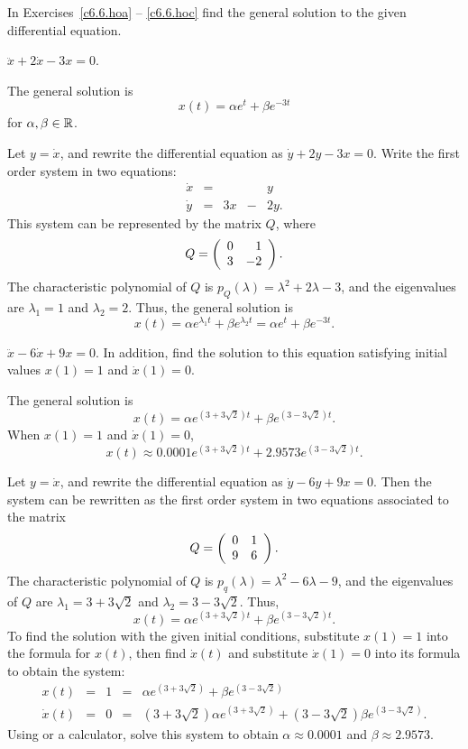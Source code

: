 \documentclass{ximera}
\begin{document}
\noindent  In Exercises~\ref{c6.6.hoa} -- \ref{c6.6.hoc} find the general
solution to the given differential equation.
\begin{exercise} \label{c6.6.hoa}
$\ddot{x} + 2\dot{x} - 3x = 0$.

\begin{solution}

\ans The general solution is
\[
x(t) = \alpha e^t + \beta e^{-3t}
\]
for $\alpha, \beta \in \mbox{$\Bbb{R}$}$.

\soln Let $y = \dot{x}$, and rewrite the differential equation as
$\dot{y} + 2y - 3x = 0$.  Write the first order system in two equations:
\[
\begin{array}{rrrrr}
\dot{x} & = & & & y \\
\dot{y} & = & 3x & - & 2y.
\end{array}
\]
This system can be represented by the matrix $Q$, where
\[
Q = \left(\begin{array}{rr} 0 & 1\\ 3 &-2\end{array}\right).
\]
The characteristic polynomial of $Q$ is $p_Q(\lambda) = \lambda^2
+ 2\lambda - 3$, and the eigenvalues are $\lambda_1 = 1$ and
$\lambda_2 = 2$.  Thus, the general solution is
\[
x(t) = \alpha e^{\lambda_1t} + \beta e^{\lambda_2t} =
\alpha e^t + \beta e^{-3t}.
\]

\end{solution}
\end{exercise}
\begin{exercise} \label{c6.6.hob}
$\ddot{x} - 6\dot{x} + 9x = 0$.
In addition, find the solution to this equation satisfying
initial values $x(1)=1$ and $\dot{x}(1)=0$.

\begin{solution}

\ans The general solution is
\[
x(t) = \alpha e^{(3 + 3\sqrt{2})t} + \beta e^{(3 - 3\sqrt{2})t}.
\]
When $x(1) = 1$ and $\dot{x}(1) = 0$,
\[
x(t) \approx 0.0001e^{(3 + 3\sqrt{2})t} +
2.9573e^{(3 - 3\sqrt{2})t}.
\]

\soln Let $y = \dot{x}$, and rewrite the differential equation as
$\dot{y} - 6y + 9x = 0$.  Then the system can be rewritten as the first
order system in two equations associated to the matrix
\[
Q = \left(\begin{array}{rr} 0 & 1\\ 9 &6\end{array}\right).
\]
The characteristic polynomial of $Q$ is $p_q(\lambda) = \lambda^2 
- 6\lambda - 9$, and the eigenvalues of $Q$ are $\lambda_1 = 3 +
3\sqrt{2}$ and $\lambda_2 = 3 - 3\sqrt{2}$.  Thus,
\[
x(t) = \alpha e^{(3 + 3\sqrt{2})t} + \beta e^{(3 - 3\sqrt{2})t}.
\]
To find the solution with the given initial conditions, substitute $x(1)
= 1$ into the formula for $x(t)$, then find $\dot{x}(t)$ and substitute
$\dot{x}(1) = 0$ into its formula to obtain the system:
\[
\begin{array}{rcccl}
x(t) & = & 1 & = & \alpha e^{(3 + 3\sqrt{2})} + \beta e^{(3 - 3\sqrt{2})} \\
\dot{x}(t) & = & 0 & = & (3 + 3\sqrt{2})\alpha e^{(3 + 3\sqrt{2})}
+ (3 - 3\sqrt{2})\beta e^{(3 - 3\sqrt{2})}.
\end{array}
\]
Using \Matlab or a calculator, solve this system to obtain $\alpha \approx
0.0001$ and $\beta \approx 2.9573$.

\end{solution}
\end{exercise}
\end{document}
